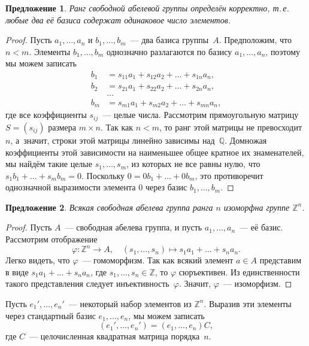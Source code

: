 \documentclass[a4paper,10pt]{amsart}
\def\ZZ{{\mathbb Z}}%
\def\QQ{{\mathbb Q}}%
\newtheorem{proposition}{Предложение}
\theoremstyle{definition}
\theoremstyle{remark}
\begin{document}
\begin{proposition}
Ранг свободной абелевой группы определён корректно, т.\,е. любые два
её базиса содержат одинаковое число элементов.
\end{proposition}

\begin{proof}
Пусть $a_1, \ldots, a_n$ и $b_1, \ldots, b_m$~--- два базиса
группы~$A$. Предположим, что $n < m$. Элементы $b_1, \ldots, b_m$
однозначно разлагаются по базису $a_1, \ldots, a_n$, поэтому мы
можем записать
$$
\begin{aligned}
b_1 &= s_{11}a_1 + s_{12}a_2 + \ldots + s_{1n}a_n, \\
b_2 &= s_{21}a_1 + s_{22}a_2 + \ldots + s_{2n}a_n,\\
 &\ldots \\
b_m &= s_{m1}a_1 + s_{m2}a_2 + \ldots + s_{mn}a_n,
\end{aligned}
$$
где все коэффициенты $s_{ij}$~--- целые числа. Рассмотрим
прямоугольную матрицу $S = (s_{ij})$ размера $m \times n$. Так как
$n < m$, то ранг этой матрицы не превосходит~$n$, а~значит, строки
этой матрицы линейно зависимы над~$\QQ$. Домножая коэффициенты этой
зависимости на наименьшее общее кратное их знаменателей, мы найдём
такие целые $s_1, \ldots, s_m$, из которых не все равны нулю, что
$s_1 b_1 + \ldots + s_m b_m=0$. Поскольку $0 = 0b_1 + \ldots +
0b_m$, это противоречит однозначной выразимости элемента $0$ через
базис $b_1, \ldots, b_m$.
\end{proof}

\begin{proposition}
Всякая свободная абелева группа ранга $n$ изоморфна группе $\ZZ^n$.
\end{proposition}

\begin{proof}
Пусть $A$~--- свободная абелева группа, и пусть $a_1,\ldots,a_n$~---
её базис. Рассмотрим отображение
$$\varphi \colon \ZZ^n \to A, \quad (s_1, \ldots, s_n)
\mapsto s_1a_1 + \ldots + s_na_n.
$$
Легко видеть, что $\varphi$~--- гомоморфизм. Так как всякий элемент
$a \in A$ представим в виде $s_1a_1 + \ldots + s_na_n$, где $s_1,
\ldots, s_n \in \ZZ$, то $\varphi$ сюръективен. Из единственности
такого представления следует инъективность~$\varphi$. Значит,
$\varphi$~--- изоморфизм.
\end{proof}

Пусть $e_1', \ldots, e_n'$~--- некоторый набор элементов из $\ZZ^n$.
Выразив эти элементы через стандартный базис $e_1, \ldots, e_n$, мы
можем записать
$$
(e_1', \ldots, e_n') = (e_1, \ldots, e_n)C,
$$
где $C$~--- целочисленная квадратная матрица порядка~$n$.
\end{document}

